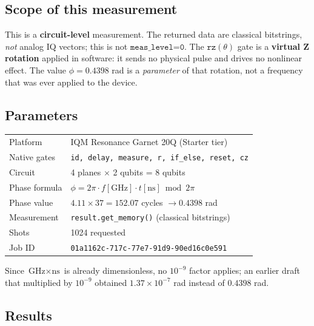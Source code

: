 \documentclass[11pt,a4paper]{article}
\begin{document}
\subsection{Scope of this measurement}

This is a \textbf{circuit-level} measurement. The returned data are classical
bitstrings, \emph{not} analog IQ vectors; this is not $\texttt{meas\_level=0}$.
The $\texttt{rz}(\theta)$ gate is a \textbf{virtual Z rotation} applied in
software: it sends no physical pulse and drives no nonlinear effect. The value
$\phi = 0.4398$ rad is a \emph{parameter} of that rotation, not a frequency that
was ever applied to the device.

\subsection{Parameters}
\begin{table}[h]
\centering
\begin{tabular}{ll}
\toprule
Platform & IQM Resonance Garnet 20Q (Starter tier) \\
Native gates & \texttt{id, delay, measure, r, if\_else, reset, cz} \\
Circuit & 4 planes $\times$ 2 qubits = 8 qubits \\
Phase formula & $\phi = 2\pi \cdot f[\text{GHz}] \cdot t[\text{ns}] \bmod 2\pi$ \\
Phase value & $4.11 \times 37 = 152.07$ cycles $\to 0.4398$ rad \\
Measurement & \texttt{result.get\_memory()} (classical bitstrings) \\
Shots & 1024 requested \\
Job ID & \texttt{01a1162c-717c-77e7-91d9-90ed16c0e591} \\
\bottomrule
\end{tabular}
\end{table}

Since $\text{GHz}\times\text{ns}$ is already dimensionless, no $10^{-9}$
factor applies; an earlier draft that multiplied by $10^{-9}$ obtained
$1.37\times10^{-7}$ rad instead of $0.4398$ rad.

\subsection{Results}
\end{document}
